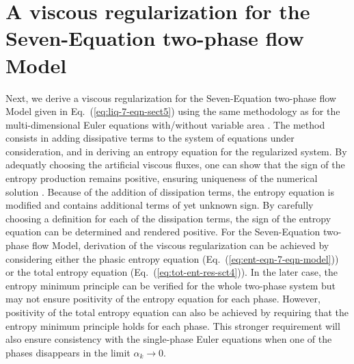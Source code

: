 \documentclass[preprint,10pt]{elsarticle}
\newcommand{\eqt}[1]{Eq.~(\ref{#1})}                     %
\begin{document}
\section{A viscous regularization for the Seven-Equation two-phase flow Model}\label{sec:visc-regu}
%
Next, we derive a viscous regularization for the Seven-Equation two-phase flow Model given in \eqt{eq:liq-7-eqn-sect5} using the same methodology as for the multi-dimensional Euler equations with/without variable area \cite{jlg, Marco_paper_low_mach}. The method consists in adding dissipative terms to the system of equations under consideration, and in deriving an entropy equation for the regularized system. By adequatly choosing the artificial viscous fluxes, one can show that the sign of the entropy production remains positive, ensuring uniqueness of the numerical solution \cite{Leveque}. Because of the addition of dissipation terms, the entropy equation is modified and contains additional terms of yet unknown sign. By carefully choosing a definition for each of the dissipation terms, the sign of the entropy equation can be determined and rendered positive. For the Seven-Equation two-phase flow Model, derivation of the viscous regularization can be achieved by considering either the phasic entropy equation (\eqt{eq:ent-eqn-7-eqn-model}) or the total entropy equation (\eqt{eq:tot-ent-res-sct4}). In the later case, the entropy minimum principle can be verified for the whole two-phase system but may not ensure positivity of the entropy equation for each phase. However, positivity of the total entropy equation can also be achieved by requiring that the entropy minimum principle holds for each phase. This stronger requirement will also ensure consistency with the single-phase Euler equations when one of the phases disappears in the limit $\alpha_k \to 0$. 
\end{document}
